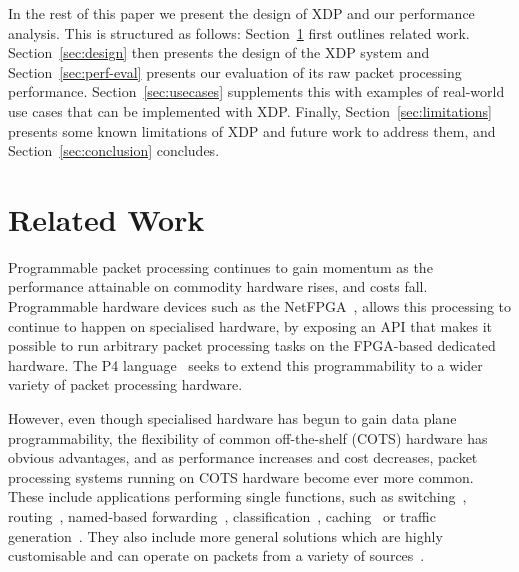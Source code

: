 \documentclass[10pt,sigconf,anonymous]{acmart}
\begin{document}
In the rest of this paper we present the design of XDP and our performance
analysis. This is structured as follows: Section~\ref{sec:related-work} first
outlines related work. Section~\ref{sec:design} then presents the design of the
XDP system and Section~\ref{sec:perf-eval} presents our evaluation of its raw
packet processing performance. Section~\ref{sec:usecases} supplements this with
examples of real-world use cases that can be implemented with XDP. Finally,
Section~\ref{sec:limitations} presents some known limitations of XDP and future
work to address them, and Section~\ref{sec:conclusion} concludes.

\section{Related Work}%
\label{sec:related-work}

Programmable packet processing continues to gain momentum as the performance
attainable on commodity hardware rises, and costs fall. Programmable hardware
devices such as the NetFPGA~\cite{lockwood2007netfpga}, allows this processing
to continue to happen on specialised hardware, by exposing an API that makes it
possible to run arbitrary packet processing tasks on the FPGA-based dedicated
hardware. The P4 language~\cite{bosshart2014p4} seeks to extend this
programmability to a wider variety of packet processing hardware.

However, even though specialised hardware has begun to gain data plane
programmability, the flexibility of common off-the-shelf (COTS) hardware has
obvious advantages, and as performance increases and cost decreases, packet
processing systems running on COTS hardware become ever more common. These
include applications performing single functions, such as
switching~\cite{rizzo2012vale}, routing~\cite{han2010packetshader}, named-based
forwarding~\cite{kirchner2016augustus}, classification~\cite{santiago2012wire},
caching~\cite{mansilha2015hierarchical} or traffic
generation~\cite{emmerich2015moongen}. They also include more general solutions
which are highly customisable and can operate on packets from a variety of
sources~\cite{han2012megapipe,marian2012netslices,linguaglossa2017high,morris1999click,dobrescu2009routebricks}.
\end{document}
